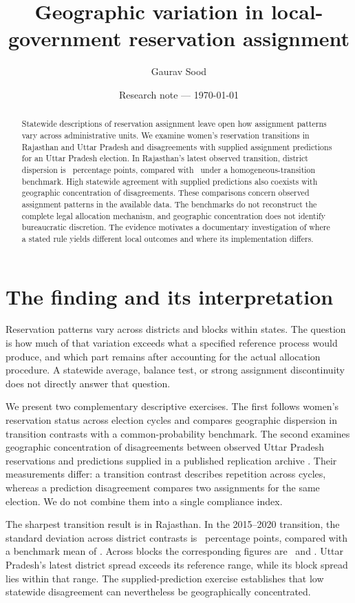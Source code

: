 \documentclass[11pt]{article}
\title{Geographic variation in local-government reservation assignment}
\author{Gaurav Sood}
\date{Research note --- \today}
\begin{document}
\maketitle
\begin{abstract}
Statewide descriptions of reservation assignment leave open how assignment patterns vary across administrative units. We examine women's reservation transitions in Rajasthan and Uttar Pradesh and disagreements with supplied assignment predictions for an Uttar Pradesh election. In Rajasthan's latest observed transition, district dispersion is \RajDistrictObserved\ percentage points, compared with \RajDistrictBenchmark\ under a homogeneous-transition benchmark. High statewide agreement with supplied predictions also coexists with geographic concentration of disagreements. These comparisons concern observed assignment patterns in the available data. The benchmarks do not reconstruct the complete legal allocation mechanism, and geographic concentration does not identify bureaucratic discretion. The evidence motivates a documentary investigation of where a stated rule yields different local outcomes and where its implementation differs.
\end{abstract}

\section{The finding and its interpretation}
Reservation patterns vary across districts and blocks within states. The question is how much of that variation exceeds what a specified reference process would produce, and which part remains after accounting for the actual allocation procedure. A statewide average, balance test, or strong assignment discontinuity does not directly answer that question.

We present two complementary descriptive exercises. The first follows women's reservation status across election cycles and compares geographic dispersion in transition contrasts with a common-probability benchmark. The second examines geographic concentration of disagreements between observed Uttar Pradesh reservations and predictions supplied in a published replication archive \citep{cdm2025}. Their measurements differ: a transition contrast describes repetition across cycles, whereas a prediction disagreement compares two assignments for the same election. We do not combine them into a single compliance index.

The sharpest transition result is in Rajasthan. In the 2015--2020 transition, the standard deviation across district contrasts is \RajDistrictObserved\ percentage points, compared with a benchmark mean of \RajDistrictBenchmark. Across blocks the corresponding figures are \RajBlockObserved\ and \RajBlockBenchmark. Uttar Pradesh's latest district spread exceeds its reference range, while its block spread lies within that range. The supplied-prediction exercise establishes that low statewide disagreement can nevertheless be geographically concentrated.
\end{document}
